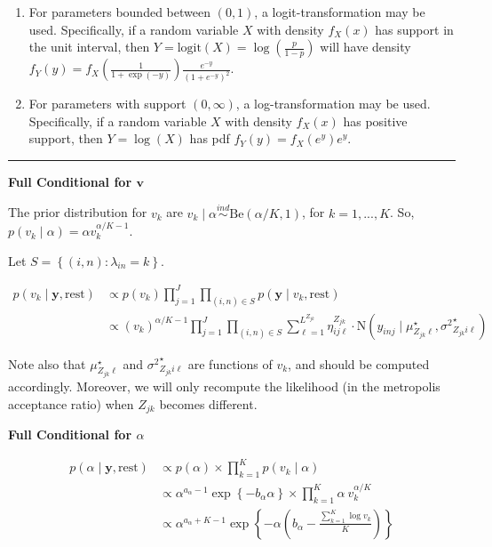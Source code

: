 \documentclass[12pt,]{article}
\providecommand{\tightlist}{%
  \setlength{\itemsep}{0pt}\setlength{\parskip}{0pt}}
\newcommand{\p}[1]{\left(#1\right)}
\newcommand{\bc}[1]{ \left\{#1\right\} }
\newcommand{\N}{ \mathcal{N} }
\newcommand{\ind}{\overset{ind}{\sim}}
\def\logit{\text{logit}}
\def\N{\text{N}}
\def\Be{\text{Be}}
\def\lin{\lambda_{in}}
\def\y{\bm{y}}
\def\mus{\mu^\star}
\def\sss{{\sigma^2}^\star}
\def\rest{\text{rest}}
\begin{document}
\begin{enumerate}
\def\labelenumi{\arabic{enumi}.}
\tightlist
\item
  For parameters bounded between \((0,1)\), a logit-transformation may
  be used. Specifically, if a random variable \(X\) with density
  \(f_X(x)\) has support in the unit interval, then
  \(Y=\logit(X)=\log\p{\frac{p}{1-p}}\) will have density
  \(f_Y(y) = f_X\p{\frac{1}{1+\exp(-y)}}\frac{e^{-y}}{(1+e^{-y})^{2}}\).
\item
  For parameters with support \((0,\infty)\), a log-transformation may
  be used. Specifically, if a random variable \(X\) with density
  \(f_X(x)\) has positive support, then \(Y = \log(X)\) has pdf
  \(f_Y(y) = f_X(e^y) e^y\).
\end{enumerate}



\vspace{5em}
\hrule
\vspace{5em}

\textbf{Full Conditional for $\bm v$}

The prior distribution for \(v_k\) are
\(v_k \mid \alpha \ind \Be(\alpha/K, 1)\), for \(k = 1,...,K\). So,
\(p(v_k \mid \alpha) = \alpha v_k^{\alpha/K-1}\).

Let \(S = \bc{(i,n)\colon \lin = k}\).

\begin{align*}
p(v_k \mid \y, \rest) &\propto p(v_k) \prod_{j=1}^J\prod_{(i,n)\in S} p(\y \mid v_k, \rest) \\
&\propto (v_k)^{\alpha/K-1} \prod_{j=1}^J \prod_{(i,n)\in S}
\sum_{\ell=1}^{L^{Z_{jk}}} \eta^{Z_{jk}}_{ij\ell} \cdot
\N(y_{inj} \mid \mus_{Z_{jk}\ell}, \sss_{Z_{jk}i\ell})
\end{align*}


Note also that \(\mus_{Z_{jk}\ell}\) and \(\sss_{Z_{jk}i\ell}\) are
functions of \(v_k\), and should be computed accordingly. Moreover, we
will only recompute the likelihood (in the metropolis acceptance ratio)
when \(Z_{jk}\) becomes different.
\vspace{2em}


\textbf{Full Conditional for $\alpha$}

\begin{align*}
p(\alpha \mid \y, \rest) &\propto p(\alpha) \times \prod_{k=1}^K p(v_k \mid \alpha) \\
&\propto \alpha^{a_\alpha - 1} \exp\bc{-b_\alpha \alpha} \times \prod_{k=1}^K 
\alpha~v_k^{\alpha/K} \\
&\propto \alpha^{a_\alpha + K -1} \exp\bc{-\alpha\p{b_\alpha - 
\frac{\sum_{k=1}^K \log v_k}{K}}}
\end{align*}
\end{document}
